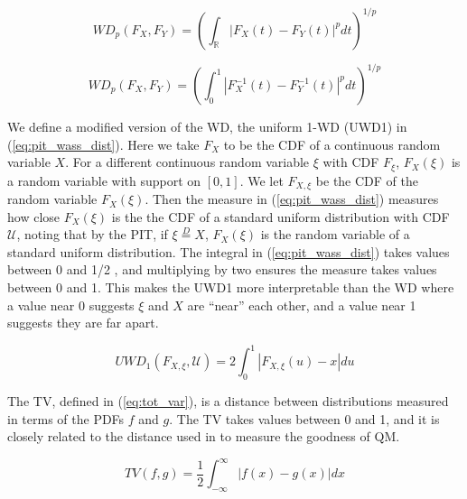\begin{equation}
    \label{eq:wass_dist_cdf}
    WD_p (F_X, F_Y) = \left( \int_{\mathbb{R}} |F_X(t) - F_Y(t)|^p dt\right)^{1/p}
\end{equation}

\begin{equation}
    \label{eq:wass_dist_quant}
    WD_p (F_X, F_Y) = \left( \int_0^1 |F^{-1}_X(t) - F^{-1}_Y(t)|^p dt \right)^{1/p}
\end{equation}

We define a modified version of the WD, the uniform 1-WD (UWD1) in 
(\ref{eq:pit_wass_dist}). Here we take $F_X$ to be the CDF of a continuous 
random variable $X$. For a different continuous random variable $\xi$ with CDF 
$F_{\xi}$, $F_X(\xi)$ is a random variable with support on $[0,1]$. We let 
$F_{X,\xi}$ be the CDF of the random variable $F_X(\xi)$. Then the measure in 
(\ref{eq:pit_wass_dist}) measures how close $F_X(\xi)$ is the the CDF of 
a standard uniform distribution with CDF $\mathcal{U}$, 
noting that by the PIT, if 
$\xi \overset{D}{=} X$, $F_X(\xi)$ is the random variable of a standard uniform 
distribution. The integral in (\ref{eq:pit_wass_dist}) takes values between
0 and 1/2 \cite[]{645854}, and multiplying by two 
ensures the measure takes values between 0 and 1. This makes the UWD1 more
interpretable than the WD
where a value near 0 suggests $\xi$ and $X$ are ``near'' each other, and a value
near 1 suggests they are far apart.   

\begin{equation}
    \label{eq:pit_wass_dist}
    UWD_1(F_{X,\xi}, \mathcal{U}) = 2\int_0^1 |F_{X,\xi} (u) - x|du
\end{equation}



The TV, defined in (\ref{eq:tot_var}), is a distance between distributions 
measured in terms of the PDFs $f$ and $g$. The TV takes values between 0 and 1, 
and it is closely related to the distance used in 
\cite{sgouropoulos2015matching} to measure the goodness of QM.  

\begin{equation}
    \label{eq:tot_var}
    TV(f,g) = \frac{1}{2} \int_{-\infty}^{\infty}|f(x) - g(x) | dx
\end{equation}


